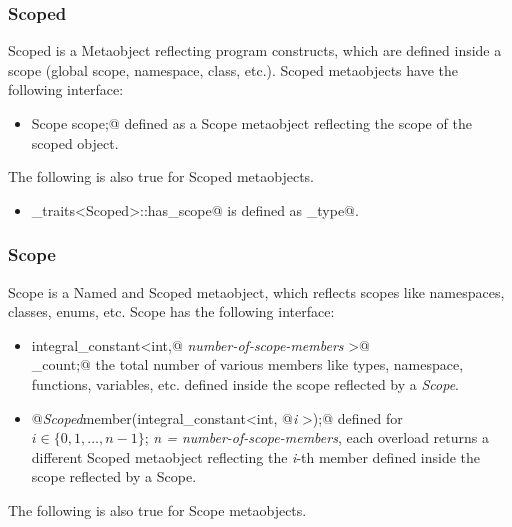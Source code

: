 \subsubsection{Scoped}

{\metaobject Scoped} is a {\metaobject Metaobject} reflecting program constructs,
which are defined inside a scope (global scope, namespace, class, etc.). {\metaobject Scoped}
metaobjects have the following interface:

\begin{itemize}
	\item{\verb@typedef Scope scope;@} defined as a {\metaobject Scope} metaobject
	reflecting the scope of the scoped object.
\end{itemize}

The following is also true for {\metaobject Scoped} metaobjects.

\begin{itemize}
	\item \verb@metaobject_traits<Scoped>::has_scope@ is defined as \verb@true_type@.
\end{itemize}

\subsubsection{Scope}

{\metaobject Scope} is a {\metaobject Named} and {\metaobject Scoped} metaobject,
which reflects scopes like namespaces, classes, enums, etc. {\metaobject Scope}
has the following interface:

\begin{itemize}

	\item{\verb@typedef integral_constant<int,@ {\em number-of-scope-members}
	\verb@>@\\\verb@member_count;@} the total number of various members like types,
	namespace, functions, variables, etc. defined inside
	the scope reflected by a {\em Scope}.

	\item{\verb@static @{\em Scoped}\verb@ member(integral_constant<int, @{\em i}
	\verb@>);@} defined for $i \in \{0, 1, \dots, n-1\}$; {\em n = number-of-scope-members},
	each overload returns a different {\metaobject Scoped} metaobject reflecting the {\em i}-th member
	defined inside the scope reflected by a {\metaobject Scope}.
\end{itemize}

The following is also true for {\metaobject Scope} metaobjects.

